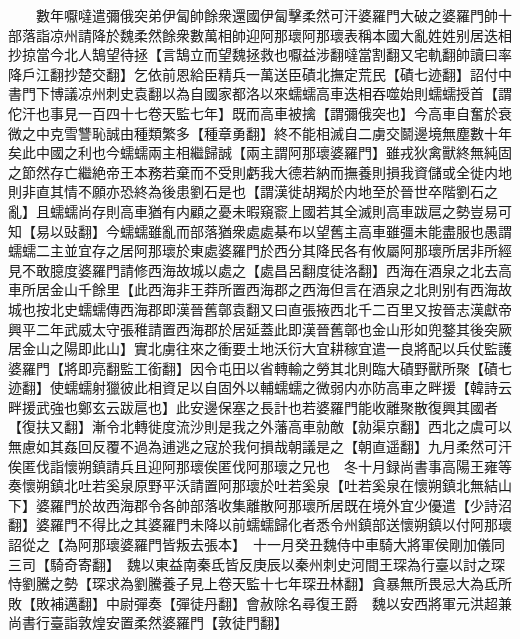 　　數年嚈噠遣彌俄突弟伊匐帥餘衆還國伊匐擊柔然可汗婆羅門大破之婆羅門帥十部落詣凉州請降於魏柔然餘衆數萬相帥迎阿那瓌阿那瓌表稱本國大亂姓姓别居迭相抄掠當今北人鵠望待拯【言鵠立而望魏拯救也嚈益涉翻噠當割翻又宅軌翻帥讀曰率降戶江翻抄楚交翻】乞依前恩給臣精兵一萬送臣磧北撫定荒民【磧七迹翻】詔付中書門下博議凉州刺史袁翻以為自國家都洛以來蠕蠕高車迭相吞噬始則蠕蠕授首【謂佗汗也事見一百四十七卷天監七年】既而高車被擒【謂彌俄突也】今高車自奮於衰微之中克雪讐恥誠由種類繁多【種章勇翻】終不能相滅自二虜交鬬邊境無塵數十年矣此中國之利也今蠕蠕兩主相繼歸誠【兩主謂阿那瓌婆羅門】雖戎狄禽獸終無純固之節然存亡繼絶帝王本務若棄而不受則虧我大德若納而撫養則損我資儲或全徙内地則非直其情不願亦恐終為後患劉石是也【謂漢徙胡羯於内地至於晉世卒階劉石之亂】且蠕蠕尚存則高車猶有内顧之憂未暇窺窬上國若其全滅則高車跋扈之勢豈易可知【易以䜴翻】今蠕蠕雖亂而部落猶衆處處棊布以望舊主高車雖彊未能盡服也愚謂蠕蠕二主並宜存之居阿那瓌於東處婆羅門於西分其降民各有攸屬阿那瓌所居非所經見不敢臆度婆羅門請修西海故城以處之【處昌呂翻度徒洛翻】西海在酒泉之北去高車所居金山千餘里【此西海非王莽所置西海郡之西海但言在酒泉之北則别有西海故城也按北史蠕蠕傳西海郡即漢晉舊鄣袁翻又曰直張掖西北千二百里又按晉志漢獻帝興平二年武威太守張稚請置西海郡於居延蓋此即漢晉舊鄣也金山形如兜鍪其後突厥居金山之陽即此山】實北虜往來之衝要土地沃衍大宜耕稼宜遣一良將配以兵仗監護婆羅門【將即亮翻監工銜翻】因令屯田以省轉輸之勞其北則臨大磧野獸所聚【磧七迹翻】使蠕蠕射獵彼此相資足以自固外以輔蠕蠕之微弱内亦防高車之畔援【韓詩云畔援武強也鄭玄云跋扈也】此安邊保塞之長計也若婆羅門能收離聚散復興其國者【復扶又翻】漸令北轉徙度流沙則是我之外藩高車勍敵【勍渠京翻】西北之虞可以無慮如其姦回反覆不過為逋逃之寇於我何損哉朝議是之【朝直遥翻】九月柔然可汗俟匿伐詣懷朔鎮請兵且迎阿那瓌俟匿伐阿那瓌之兄也　冬十月録尚書事高陽王雍等奏懷朔鎮北吐若奚泉原野平沃請置阿那瓌於吐若奚泉【吐若奚泉在懷朔鎮北無結山下】婆羅門於故西海郡令各帥部落收集離散阿那瓌所居既在境外宜少優遣【少詩沼翻】婆羅門不得比之其婆羅門未降以前蠕蠕歸化者悉令州鎮部送懷朔鎮以付阿那瓌詔從之【為阿那瓌婆羅門皆叛去張本】　十一月癸丑魏侍中車騎大將軍侯剛加儀同三司【騎奇寄翻】　魏以東益南秦氐皆反庚辰以秦州刺史河間王琛為行臺以討之琛恃劉騰之勢【琛求為劉騰養子見上卷天監十七年琛丑林翻】貪暴無所畏忌大為氐所敗【敗補邁翻】中尉彈奏【彈徒丹翻】會赦除名尋復王爵　魏以安西將軍元洪超兼尚書行臺詣敦煌安置柔然婆羅門【敦徒門翻】

